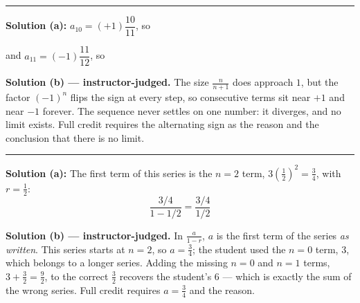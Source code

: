 \documentclass[12pt]{article}
\begin{document}
\vspace{0.15cm}\noindent\rule{\linewidth}{0.2pt}\vspace{0.15cm}


\textbf{Solution (a):} \quad $a_{10} = (+1)\dfrac{10}{11}$, so 

and $a_{11} = (-1)\dfrac{11}{12}$, so 

\textbf{Solution (b) --- instructor-judged.} \quad The size $\frac{n}{n+1}$ does approach $1$,
but the factor $(-1)^n$ flips the sign at every step, so consecutive terms sit near $+1$ and
near $-1$ forever. The sequence never settles on one number: it diverges, and no limit exists.
Full credit requires the alternating sign as the reason and the conclusion that there is no
limit.

\vspace{0.15cm}\noindent\rule{\linewidth}{0.2pt}\vspace{0.15cm}


\textbf{Solution (a):} \quad The first term of this series is the $n = 2$ term,
$3\left(\frac{1}{2}\right)^{2} = \frac{3}{4}$, with $r = \frac{1}{2}$:
\[ \frac{3/4}{1 - 1/2} = \frac{3/4}{1/2} \]

\textbf{Solution (b) --- instructor-judged.} \quad In $\frac{a}{1-r}$, $a$ is the first term of
the series \emph{as written}. This series starts at $n = 2$, so $a = \frac{3}{4}$; the student
used the $n = 0$ term, $3$, which belongs to a longer series. Adding the missing $n=0$ and
$n=1$ terms, $3 + \frac{3}{2} = \frac{9}{2}$, to the correct $\frac{3}{2}$ recovers the
student's $6$ --- which is exactly the sum of the wrong series. Full credit requires
$a = \frac{3}{4}$ and the reason.
\end{document}

